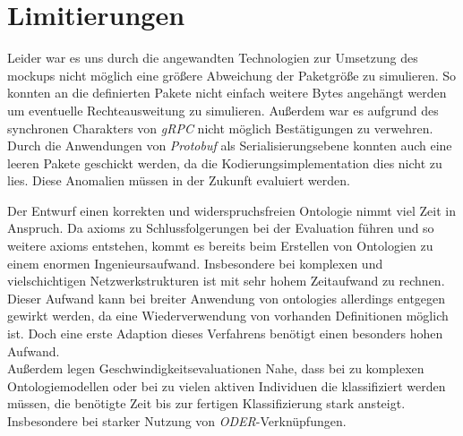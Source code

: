 \section{Limitierungen}
Leider war es uns durch die angewandten Technologien zur Umsetzung des \Gls{mockup}s nicht möglich eine größere Abweichung der Paketgröße zu simulieren. So konnten an die definierten Pakete nicht einfach weitere Bytes angehängt werden um eventuelle Rechteausweitung zu simulieren. Außerdem war es aufgrund des synchronen Charakters von \textit{gRPC}\cite{grpc} nicht möglich Bestätigungen zu verwehren. Durch die Anwendungen von \textit{Protobuf}\cite{protobuf} als Serialisierungsebene konnten auch eine leeren Pakete geschickt werden, da die Kodierungsimplementation dies nicht zu lies. Diese Anomalien müssen in der Zukunft evaluiert werden.\bigskip

Der Entwurf einen korrekten und widerspruchsfreien Ontologie nimmt viel Zeit in Anspruch. Da \Glspl{axiom} zu Schlussfolgerungen bei der Evaluation führen und so weitere \Glspl{axiom} entstehen, kommt es bereits beim Erstellen von Ontologien zu einem enormen Ingenieursaufwand. Insbesondere bei komplexen und vielschichtigen Netzwerkstrukturen ist mit sehr hohem Zeitaufwand zu rechnen. Dieser Aufwand kann bei breiter Anwendung von \Glspl{ontologie} allerdings entgegen gewirkt werden, da eine Wiederverwendung von vorhanden Definitionen möglich ist\cite{borst1999construction}. Doch eine erste Adaption dieses Verfahrens benötigt einen besonders hohen Aufwand.\\
Außerdem legen Geschwindigkeitsevaluationen Nahe, dass bei zu komplexen Ontologiemodellen oder bei zu vielen aktiven Individuen die klassifiziert werden müssen, die benötigte Zeit bis zur fertigen Klassifizierung stark ansteigt. Insbesondere bei starker Nutzung von \textit{ODER}-Verknüpfungen.\cite[p.~5]{roy2010exploitation}\\